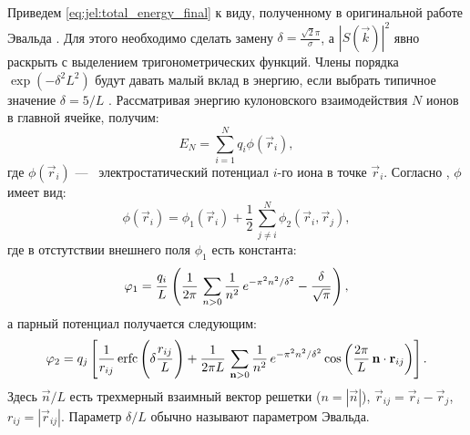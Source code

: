 Приведем \eqref{eq:jel:total_energy_final} к виду, полученному в оригинальной работе Эвальда \cite{ewald:summation_original}.
Для этого необходимо сделать замену $\delta = \frac{\sqrt{2} \pi}{\sigma}$, а $| S (\vec{k}) |^2$ явно раскрыть с выделением тригонометрических функций. Члены порядка $\exp(-\delta^2 L^2)$ будут давать малый вклад в энергию, если выбрать типичное значение $\delta = 5 / L$ \cite{rapaport:terms_cutoff}.
Рассматривая энергию кулоновского взаимодействия $N$ ионов в главной ячейке, получим:
\begin{equation}
    \label{eq:mean:E_coloumb_main-cell}
    E_N = \sum\limits_{i=1}^{N} q_i \phi (\vec{r}_{i}),
\end{equation}
где $\phi (\vec{r}_{i})$ ---~ электростатический потенциал $i$-го иона в точке $\vec{r}_{i}$.
Согласно \cite{ewald:summation_original}, $\phi$ имеет вид:
\begin{equation}
    \label{eq:mean:phi_as_sum}
    \phi (\vec{r}_{i}) = \phi_1 (\vec{r}_{i}) + \frac{1}{2}\, \sum\limits_{j \neq i}^{N} \phi_2 (\vec{r}_{i}, \vec{r}_{j}),
\end{equation}
где в отстутствии внешнего поля $\phi_1$ есть константа:
\begin{equation}
    \label{eq:mean:phi_1}
    \phi_1 = \cfrac{q_{i}}{L}\, \left( \frac{1}{2\pi}\, \sum\limits_{n > 0}^{} \frac{1}{n^2}\, e^{-\pi^2 n^2 / \delta^2} - \cfrac{\delta}{\sqrt{\pi}}\, \right),
\end{equation}
а парный потенциал получается следующим:
\begin{equation}
    \label{eq:mean:phi_2}
    \phi_2 = q_{j} \left[ \frac{1}{r_{ij}}\, \mathrm{erfc} \left( \delta \cfrac{r_{ij}}{L}\, \right) + \frac{1}{2\pi L}\, \sum\limits_{\vec{n} > 0}^{} \frac{1}{n^2}\, e^{-\pi^2 n^2 / \delta^2} \cos \left( \frac{2\pi}{L}\, \vec{n} \cdot \vec{r}_{ij} \right) \right].
\end{equation}
Здесь $\vec{n} / L$ есть трехмерный взаимный вектор решетки ($n = | \vec{n} |$), $\vec{r}_{ij} = \vec{r}_{i} - \vec{r}_{j}$, $r_{ij} = |\vec{r}_{ij}|$.
Параметр $\delta / L$ обычно называют параметром Эвальда.

